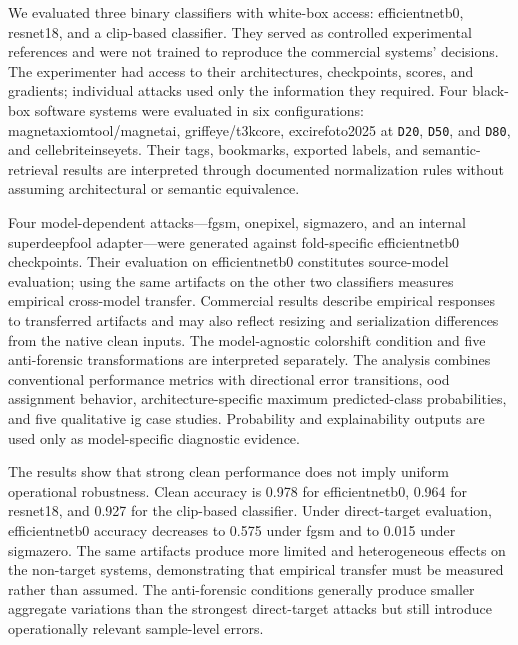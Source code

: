 We evaluated three binary classifiers with white-box access: \gls{efficientnetb0},
\gls{resnet18}, and a \gls{clip}-based classifier. They served as controlled
experimental references and were not trained to reproduce the commercial
systems' decisions. The experimenter had access to their architectures,
checkpoints, scores, and gradients; individual attacks used only the information
they required. Four black-box software systems were evaluated in six configurations:
\gls{magnetaxiomtool}/\gls{magnetai},
\gls{griffeye}/\gls{t3kcore},
\gls{excirefoto2025} at \texttt{D20}, \texttt{D50}, and \texttt{D80}, and
\gls{cellebriteinseyets}. Their tags, bookmarks, exported labels, and
semantic-retrieval results are interpreted through documented normalization
rules without assuming architectural or semantic equivalence.

Four model-dependent attacks---\gls{fgsm}, \gls{onepixel}, \gls{sigmazero},
and an internal \gls{superdeepfool} adapter---were generated against fold-specific
\gls{efficientnetb0} checkpoints. Their evaluation on \gls{efficientnetb0}
constitutes source-model evaluation; using the same artifacts on the other two
classifiers measures empirical cross-model transfer. Commercial results describe
empirical responses to transferred artifacts and may also reflect resizing
and serialization differences from the native clean inputs. The
model-agnostic \gls{colorshift} condition and five anti-forensic transformations
are interpreted separately. The analysis combines conventional performance
metrics with directional error transitions, \gls{ood} assignment behavior,
architecture-specific maximum predicted-class probabilities, and five
qualitative \gls{ig} case studies. Probability and explainability outputs are
used only as model-specific diagnostic evidence.

The results show that strong clean performance does not imply uniform
operational robustness. Clean accuracy is 0.978 for
\gls{efficientnetb0}, 0.964 for \gls{resnet18}, and 0.927 for the
\gls{clip}-based classifier. Under direct-target evaluation,
\gls{efficientnetb0} accuracy decreases to 0.575 under \gls{fgsm} and to 0.015
under \gls{sigmazero}. The same artifacts produce more limited and
heterogeneous effects on the non-target systems, demonstrating that empirical
transfer must be measured rather than assumed. The anti-forensic conditions
generally produce smaller aggregate variations than the strongest direct-target
attacks but still introduce operationally relevant sample-level errors.

